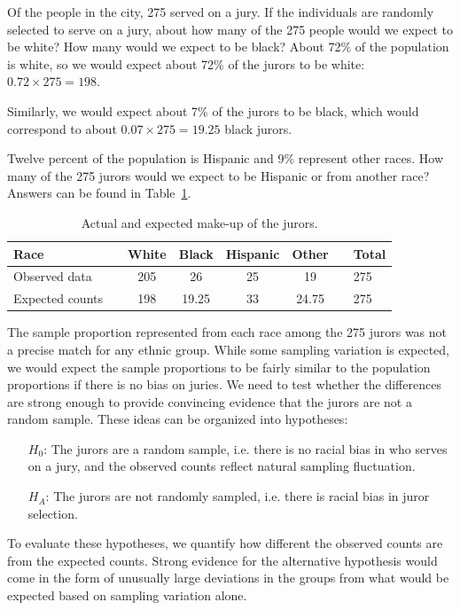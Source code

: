 \begin{example}{Of the people in the city, 275 served on a jury. If the individuals are randomly selected to serve on a jury, about how many of the 275 people would we expect to be white? How many would we expect to be black?}
About 72\% of the population is white, so we would expect about 72\% of the jurors to be white: $0.72\times 275 = 198$.

Similarly, we would expect about 7\% of the jurors to be black, which would correspond to about $0.07\times 275 = 19.25$ black jurors.
\end{example}

\begin{exercise}
Twelve percent of the population is Hispanic and 9\% represent other races. How many of the 275 jurors would we expect to be Hispanic or from another race? Answers can be found in Table~\ref{expectedJuryRepresentationIfNoBias}.
\end{exercise}

\begin{table}[h]
\centering
\begin{tabular}{ll ccc c ll}
\hline
Race	 & \hspace{2mm} & White & Black & Hispanic & Other & \hspace{2mm} & Total \\
\hline
Observed data			&	& 205 & 26	& 25 & 19	&	& 275 \\
Expected counts	 &	& 198 & 19.25 & 33 & 24.75 & & 275 \\
\hline
\end{tabular}
\caption{Actual and expected make-up of the jurors.}
\label{expectedJuryRepresentationIfNoBias}
\end{table}

The sample proportion represented from each race among the 275 jurors was not a precise match for any ethnic group. While some sampling variation is expected, we would expect the sample proportions to be fairly similar to the population proportions if there is no bias on juries. We need to test whether the differences are strong enough to provide convincing evidence that the jurors are not a random sample. These ideas can be organized into hypotheses:
\begin{itemize}
\setlength{\itemsep}{0mm}
\item[$H_0$:] The jurors are a random sample, i.e. there is no racial bias in who serves on a jury, and the observed counts reflect natural sampling fluctuation.
\item[$H_A$:] The jurors are not randomly sampled, i.e. there is racial bias in juror selection.
\end{itemize}
To evaluate these hypotheses, we quantify how different the observed counts are from the expected counts. Strong evidence for the alternative hypothesis would come in the form of unusually large deviations in the groups from what would be expected based on sampling variation alone.


